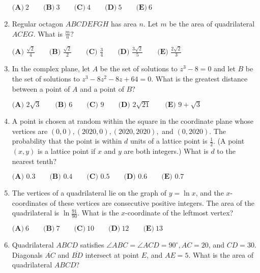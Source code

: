 \documentclass{article}
\begin{document}
\begin{enumerate}[label=\arabic*., itemsep=0.5em]
\(\textbf{(A)}\ 2\qquad\textbf{(B)}\ 3\qquad\textbf{(C)}\ 4\qquad\textbf{(D)}\ 5\qquad\textbf{(E)}\ 6\)\par \vspace{0.5em}\item Regular octagon \(ABCDEFGH\) has area \(n\). Let \(m\) be the area of quadrilateral \(ACEG\). What is \(\tfrac{m}{n}?\)

\(\textbf{(A) } \frac{\sqrt{2}}{4} \qquad \textbf{(B) } \frac{\sqrt{2}}{2} \qquad \textbf{(C) } \frac{3}{4} \qquad \textbf{(D) } \frac{3\sqrt{2}}{5} \qquad \textbf{(E) } \frac{2\sqrt{2}}{3}\)\par \vspace{0.5em}\item In the complex plane, let \(A\) be the set of solutions to \(z^3 - 8 = 0\) and let \(B\) be the set of solutions to \(z^3 - 8z^2 - 8z + 64 = 0\). What is the greatest distance between a point of \(A\) and a point of \(B?\)

\(\textbf{(A) } 2\sqrt{3} \qquad \textbf{(B) } 6 \qquad \textbf{(C) } 9 \qquad \textbf{(D) } 2\sqrt{21} \qquad \textbf{(E) } 9 + \sqrt{3}\)\par \vspace{0.5em}\item A point is chosen at random within the square in the coordinate plane whose vertices are \((0, 0), (2020, 0), (2020, 2020),\) and \((0, 2020)\). The probability that the point is within \(d\) units of a lattice point is \(\tfrac{1}{2}\). (A point \((x, y)\) is a lattice point if \(x\) and \(y\) are both integers.) What is \(d\) to the nearest tenth\(?\)

\(\textbf{(A) } 0.3 \qquad \textbf{(B) } 0.4 \qquad \textbf{(C) } 0.5 \qquad \textbf{(D) } 0.6 \qquad \textbf{(E) } 0.7\)\par \vspace{0.5em}\item The vertices of a quadrilateral lie on the graph of \(y = \ln x\), and the \(x\)-coordinates of these vertices are consecutive positive integers. The area of the quadrilateral is \(\ln \frac{91}{90}\). What is the \(x\)-coordinate of the leftmost vertex?

\(\textbf{(A)}\ 6\qquad\textbf{(B)}\ 7\qquad\textbf{(C)}\ 10\qquad\textbf{(D)}\ 12\qquad\textbf{(E)}\ 13\)\par \vspace{0.5em}\item Quadrilateral \(ABCD\) satisfies \(\angle ABC = \angle ACD = 90^{\circ}, AC = 20\), and \(CD = 30\). Diagonals \(\overline{AC}\) and \(\overline{BD}\) intersect at point \(E\), and \(AE = 5\). What is the area of quadrilateral \(ABCD\)?


\end{enumerate}
\end{document}
